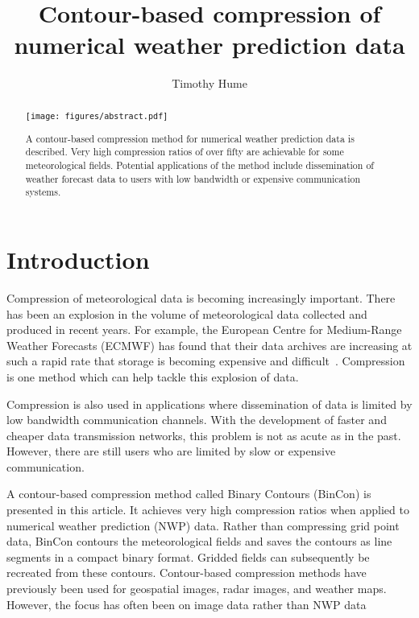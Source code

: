 \documentclass[12pt,a4paper]{article}
\title{Contour-based compression of numerical weather prediction data}
\author{Timothy Hume}
\begin{document}
\maketitle


\linenumbers
\begin{abstract}
\begin{center}
\texttt{[image: figures/abstract.pdf]}
\end{center}
A contour-based compression method for numerical weather prediction data is
described. Very high compression ratios of over fifty are achievable for some
meteorological fields. Potential applications of the method include
dissemination of weather forecast data to users with low bandwidth or expensive
communication systems.
\end{abstract}

\section*{Introduction}
\label{sec:introduction}

Compression of meteorological data is becoming increasingly important. There
has been an explosion in the volume of meteorological data collected and
produced in recent years. For example, the European Centre for Medium-Range
Weather Forecasts (ECMWF) has found that their data archives are increasing at
such a rapid rate that storage is becoming expensive and
difficult~\citep{burton_cruz2020}. Compression is one method which can help
tackle this explosion of data.

Compression is also used in applications where dissemination of data is limited
by low bandwidth communication channels. With the development of faster and
cheaper data transmission networks, this problem is not as acute as in the
past. However, there are still users who are limited by slow or expensive
communication.

A contour-based compression method called Binary Contours (BinCon) is
presented in this article. It achieves very high compression ratios when
applied to numerical weather prediction (NWP) data. Rather than
compressing grid point data, BinCon contours the meteorological fields
and saves the contours as line segments in a compact binary format. Gridded
fields can subsequently be recreated from these contours. Contour-based
compression methods have previously been used for geospatial images, radar
images, and weather maps. However, the focus has often been on image data
rather than NWP data~\citep[see][]{scarmana2011,
mahapatra_makkapati2005, gertz_grappel1994}
\end{document}
